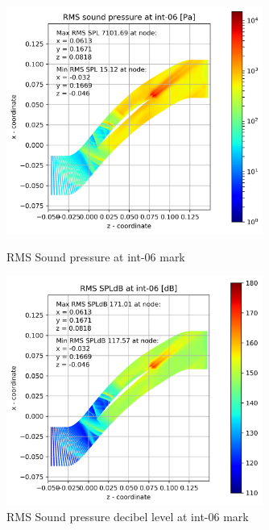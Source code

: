 \begin{figure}[ht]
  \centering
  \includegraphics[width=0.75\textwidth]{Figures/int-06-rms-spl.png}
  \caption{RMS Sound pressure at int-06 mark} \label{int-06-rms-spl}
  
  \vspace*{\floatsep}%

  \includegraphics[width=0.75\textwidth]{Figures/int-06-rms-spldb.png}
  \caption{RMS Sound pressure decibel level at int-06 mark} \label{int-06-rms-spldb}
\end{figure}
